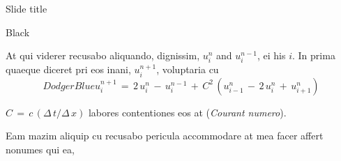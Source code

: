 \documentclass{MichiganTech}
\begin{document}
%
\begin{frame}[t]{Slide title}
  \vspace*{0.10in}
  \begin{reference}{4mm}{85.5mm}{Black}
    \;
  \end{reference}

  At qui viderer recusabo aliquando, dignissim, $u_{i}^{n}$ and $u_{i}^{n-1}$,
  ei his $i$. In prima quaeque diceret pri eos inani, $u_{i}^{n+1}$,
  voluptaria cu
  \begin{equation*}
    \boxed{DodgerBlue}{u_{i}^{n+1} \,=\, 2\,u_{i}^{n} \,-\,
      u_{i}^{n-1} \,+\, 
      C^{2}\,\left( u_{i-1}^{n} \,-\, 2\,u_{i}^{n} \,+\, u_{i+1}^{n}\right)}
  \end{equation*}

  \vspace*{0.10in}
  $C \,=\, c\,(\Delta\,t/\Delta\,x)$ labores contentiones eos at 
  (\textsl{Courant numero}).

  \pause
  \vspace*{0.10in}
  Eam mazim aliquip cu recusabo pericula accommodare at mea
  facer affert nonumes qui ea,
\end{frame}
\end{document}
